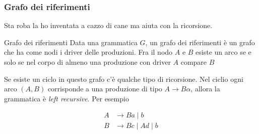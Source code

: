 \subsubsection{Grafo dei riferimenti}\label{grafo dei riferimenti}
Sta roba la ho inventata a cazzo di cane ma aiuta con la ricorsione.
\begin{definizione}{Grafo dei riferimenti}
	Data una grammatica $ G $, un grafo dei riferimenti è un grafo che ha come nodi i driver delle produzioni.
	Fra il nodo $ A $  e $ B $ esiste un arco se e solo se nel corpo di almeno una produzione con driver $ A $ compare $ B $
\end{definizione}
Se esiste un ciclo in questo grafo c'è qualche tipo di ricorsione. Nel ciclio ogni arco $ \left(A,B\right) $ corrisponde a una produzione di tipo $ A \rightarrow B \alpha $, allora la grammatica è \textit{left recursive}. Per esempio
\vskip3mm
\begin{minipage}[c]{0.48\textwidth}
	\begin{align*}
		A & \rightarrow Ba \mid b          \\
		B & \rightarrow  Bc \mid Ad \mid b
	\end{align*}
\end{minipage}
%
\begin{minipage}[c]{0.48\textwidth}
	\centering
\end{minipage}
